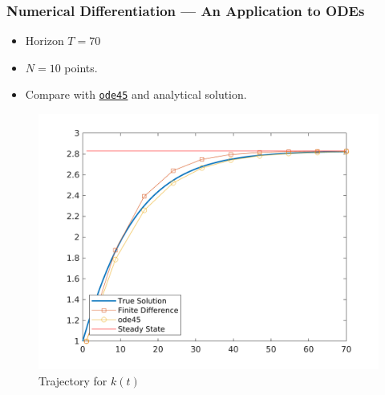 \documentclass[11pt,xcolor={svgnames},aspectratio=169,usepdftitle=false,notheorems]{beamer}
\begin{document}
\begin{frame}
  \frametitle{Numerical Differentiation --- An Application to ODEs}
  \begin{minipage}{0.3\textwidth}
  \begin{itemize}
    \item Horizon $T = 70$
    \item $N = 10$ points.
    \item Compare with \href{https://www.mathworks.com/help/matlab/ref/ode45.html}{\texttt{ode45}} and analytical solution.
  \end{itemize}
  \end{minipage}
\begin{minipage}{0.65\textwidth}
  \begin{figure}
    \centering
    \includegraphics[width = \textwidth]{../figures/solow_solution.png}
    \caption{Trajectory for $k(t)$}
    \label{fig:solow_finitedifferences}
  \end{figure}
\end{minipage}
\end{frame}
\end{document}

